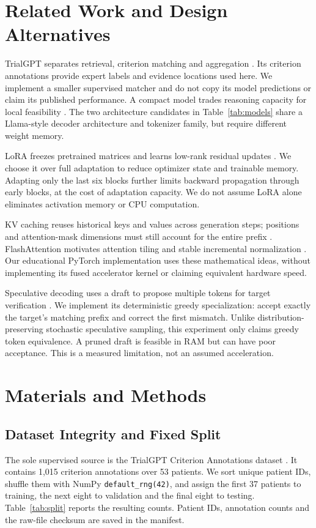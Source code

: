 \documentclass[conference]{IEEEtran}
\begin{document}
\section{Related Work and Design Alternatives}
TrialGPT separates retrieval, criterion matching and aggregation \cite{trialgpt}. Its criterion annotations provide expert labels and evidence locations used here. We implement a smaller supervised matcher and do not copy its model predictions or claim its published performance. A compact model trades reasoning capacity for local feasibility \cite{smol}. The two architecture candidates in Table~\ref{tab:models} share a Llama-style decoder architecture and tokenizer family, but require different weight memory.

LoRA freezes pretrained matrices and learns low-rank residual updates \cite{lora}. We choose it over full adaptation to reduce optimizer state and trainable memory. Adapting only the last six blocks further limits backward propagation through early blocks, at the cost of adaptation capacity. We do not assume LoRA alone eliminates activation memory or CPU computation.

KV caching reuses historical keys and values across generation steps; positions and attention-mask dimensions must still account for the entire prefix \cite{cache}. FlashAttention motivates attention tiling and stable incremental normalization \cite{flash}. Our educational PyTorch implementation uses these mathematical ideas, without implementing its fused accelerator kernel or claiming equivalent hardware speed.

Speculative decoding uses a draft to propose multiple tokens for target verification \cite{spec}. We implement its deterministic greedy specialization: accept exactly the target's matching prefix and correct the first mismatch. Unlike distribution-preserving stochastic speculative sampling, this experiment only claims greedy token equivalence. A pruned draft is feasible in RAM but can have poor acceptance. This is a measured limitation, not an assumed acceleration.

\section{Materials and Methods}
\subsection{Dataset Integrity and Fixed Split}
The sole supervised source is the TrialGPT Criterion Annotations dataset \cite{dataset}. It contains 1,015 criterion annotations over 53 patients. We sort unique patient IDs, shuffle them with NumPy \texttt{default\_rng(42)}, and assign the first 37 patients to training, the next eight to validation and the final eight to testing. Table~\ref{tab:split} reports the resulting counts. Patient IDs, annotation counts and the raw-file checksum are saved in the manifest.
\end{document}
